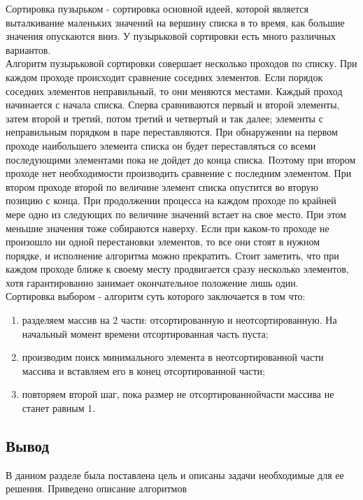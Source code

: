 	
	Сортировка пузырьком \cite{McConnel} - сортировка основной идеей, которой является выталкивание маленьких значений на вершину списка в то время, как большие значения опускаются вниз. 
	У пузырьковой сортировки есть много различных вариантов. \\
	
	
	Алгоритм пузырьковой сортировки совершает несколько проходов по списку. 
	При каждом проходе происходит сравнение соседних элементов. 
	Если порядок соседних элементов неправильный, то они меняются местами. 
	Каждый проход начинается с начала списка. 
	Сперва сравниваются первый и второй элементы, затем второй и третий, потом третий и четвертый и так далее; элементы с неправильным порядком в паре переставляются. 
	При обнаружении на первом проходе наибольшего элемента списка он будет переставляться со всеми последующими элементами пока не дойдет до конца списка. 
	Поэтому при втором проходе нет необходимости производить сравнение с последним элементом.
	При втором проходе второй по величине элемент списка опустится во вторую позицию с конца. 
	При продолжении процесса на каждом проходе по крайней мере одно из следующих по величине значений встает на свое место. 
	При этом меньшие значения тоже собираются наверху.
	Если при каком-то проходе не произошло ни одной перестановки элементов, то все они стоят в нужном порядке, и исполнение алгоритма можно прекратить. 
	Стоит заметить, что при каждом проходе ближе к своему месту продвигается сразу несколько элементов, хотя гарантированно занимает окончательное положение лишь один. \\
	

	Сортировка выбором - алгоритм суть которого заключается в том что:
	\begin{enumerate}[1)]
		\item разделяем массив на 2 части: отсортированную и неотсортированную. На начальный момент времени отсортированная часть пуста;
		\item производим поиск минимального элемента в неотсортированной части массива и вставляем его в конец отсортированной части;
		\item повторяем второй шаг, пока размер не отсортированнойчасти массива не станет равным 1.
	\end{enumerate}

\subsection{Вывод}
В данном разделе была поставлена цель и описаны задачи необходимые для ее решения. Приведено описание алгоритмов